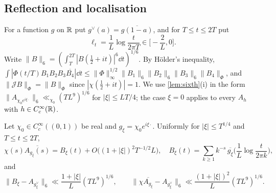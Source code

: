 \documentclass[11pt,colorlinks]{charlie}
\begin{document}
\subsection{Reflection and localisation}
For a function $g$ on $\mathbb{R}$ put $g^\vee(a)=\overline{g(1-a)}$, and for $T\le t\le2T$ put
\[
 \ell_t=\frac1L\log\frac t{2\pi T}\in\Big[-\frac2L,0\Big].
\]
Write $\|B\|_6=(\int_T^{2T}|B(\frac12+it)|^6\dd t)^{1/6}$. By H\"older's inequality, $\int|\Phi(t/T)B_1B_2B_3\overline{B_4}|\dd t\le\|\Phi\|_\infty^{1/2}\|B_1\|_6\|B_2\|_6\|B_3\|_6\|B_4\|_\Phi$, and $\|\mathcal JB\|_\Phi=\|B\|_\Phi$ since $|\chi(\frac12+it)|=1$. We use \cref{lem:sixth}(i) in the form $\|A_{\chi_0e^{i\xi\cdot}}\|_6\ll_{\chi_0}(TL^9)^{1/6}$ for $|\xi|\le LT/4$; the case $\xi=0$ applies to every $A_h$ with $h\in C_c^\infty(\mathbb{R})$.

\begin{lemma}\label{lem:reflfactor}
Let $\chi_0\in C_c^\infty((0,1))$ be real and $g_\xi=\chi_0e^{i\xi\cdot}$. Uniformly for $|\xi|\le T^{1/4}$ and $T\le t\le2T$,
\begin{equation}\label{eq:reflpointwise}
 \chi(s)\overline{A_{g_\xi}(s)}=B_\xi(t)+O\big((1+|\xi|)^2T^{-1/2}L\big),\quad B_\xi(t)=\sum_{k\ge1}k^{-s}\,\overline{g_\xi}\Big(\frac1L\log\frac t{2\pi k}\Big),
\end{equation}
and
\[
 \big\|B_\xi-A_{g_\xi^\vee}\big\|_6\ll\frac{1+|\xi|}{L}(TL^9)^{1/6},\qquad \big\|\chi\overline{A_{g_\xi}}-A_{g_\xi^\vee}\big\|_6\ll\frac{(1+|\xi|)^2}{L}(TL^9)^{1/6}.
\]
\end{lemma}
\end{document}
